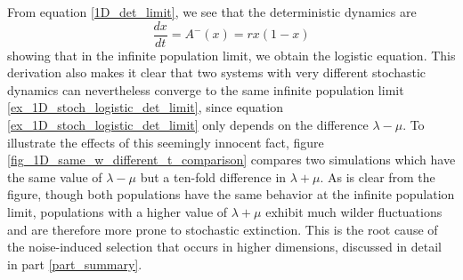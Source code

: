 From equation \eqref{1D_det_limit}, we see that the deterministic dynamics are
\begin{equation}\label{ex_1D_stoch_logistic_det_limit}
\frac{dx}{dt} = A^-(x) = rx(1-x)
\end{equation}
showing that in the infinite population limit, we obtain the logistic equation. This derivation also makes it clear that two systems with very different stochastic dynamics can nevertheless converge to the same infinite population limit \eqref{ex_1D_stoch_logistic_det_limit}, since equation \eqref{ex_1D_stoch_logistic_det_limit} only depends on the difference $\lambda-\mu$.
To illustrate the effects of this seemingly innocent fact, figure \ref{fig_1D_same_w_different_t_comparison} compares two simulations which have the same value of $\lambda - \mu$ but a ten-fold difference in $\lambda+\mu$. As is clear from the figure, though both populations have the same behavior at the infinite population limit, populations with a higher value of $\lambda+\mu$ exhibit much wilder fluctuations and are therefore more prone to stochastic extinction. This is the root cause of the noise-induced selection that occurs in higher dimensions, discussed in detail in part \ref{part_summary}.

